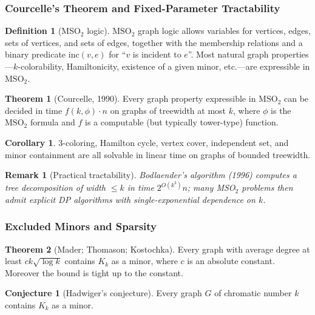 \documentclass{article}
\newtheorem{remark}{Remark}
\theoremstyle{definition}
\newtheorem{theorem}{Theorem}
\newtheorem{corollary}{Corollary}
\newtheorem{definition}{Definition}
\newtheorem{conjecture}{Conjecture}
\begin{document}
\subsubsection{Courcelle's Theorem and Fixed-Parameter Tractability}

\begin{definition}[MSO$_2$ logic]
$\mathrm{MSO}_2$ graph logic allows variables for vertices, edges,
sets of vertices, and sets of edges, together with the membership
relations and a binary predicate $\mathrm{inc}(v, e)$ for ``$v$ is
incident to $e$''. Most natural graph properties---$k$-colorability,
Hamiltonicity, existence of a given minor, etc.---are expressible in
$\mathrm{MSO}_2$.
\end{definition}

\begin{theorem}[Courcelle, 1990]\label{thm:courcelle}
Every graph property expressible in $\mathrm{MSO}_2$ can be decided in
time $f(k, \phi) \cdot n$ on graphs of treewidth at most $k$, where
$\phi$ is the $\mathrm{MSO}_2$ formula and $f$ is a computable (but
typically tower-type) function.
\end{theorem}

\begin{corollary}
$3$-coloring, Hamilton cycle, vertex cover, independent set, and
minor containment are all solvable in linear time on graphs of
bounded treewidth.
\end{corollary}

\begin{remark}[Practical tractability]
Bodlaender's algorithm (1996) computes a tree decomposition of width
$\le k$ in time $2^{O(k^3)} n$; many MSO$_2$ problems then admit
explicit DP algorithms with single-exponential dependence on $k$.
\end{remark}

\subsubsection{Excluded Minors and Sparsity}

\begin{theorem}[Mader; Thomason; Kostochka]
Every graph with average degree at least $c k \sqrt{\log k}$ contains
$K_k$ as a minor, where $c$ is an absolute constant. Moreover the
bound is tight up to the constant.
\end{theorem}

\begin{conjecture}[Hadwiger's conjecture]
Every graph $G$ of chromatic number $k$ contains $K_k$ as a minor.
\end{conjecture}
\end{document}

